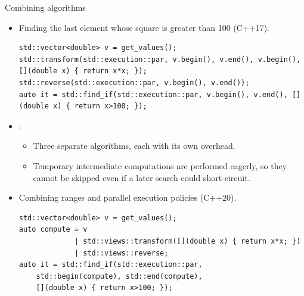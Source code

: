 \begin{frame}[t,fragile]{Combining algorithms}
\begin{itemize}

    \item Finding the last element whose square is greater than 100 (C++17).
\begin{lstlisting}
std::vector<double> v = get_values();
std::transform(std::execution::par, v.begin(), v.end(), v.begin(), [](double x) { return x*x; });
std::reverse(std::execution::par, v.begin(), v.end());
auto it = std::find_if(std::execution::par, v.begin(), v.end(), [](double x) { return x>100; });
\end{lstlisting}

    \item {}:
    \begin{itemize}
        \item Three separate algorithms, each with its own overhead.
        \item Temporary intermediate computations are performed eagerly, so they cannot be skipped even if a later search could short-circuit.
    \end{itemize}

    \item Combining ranges and parallel execution policies (C++20).
    
\begin{lstlisting}
std::vector<double> v = get_values();
auto compute = v 
             | std::views::transform([](double x) { return x*x; })
             | std::views::reverse;
auto it = std::find_if(std::execution::par, 
    std::begin(compute), std::end(compute), 
    [](double x) { return x>100; });
\end{lstlisting}

\end{itemize}
\end{frame}

